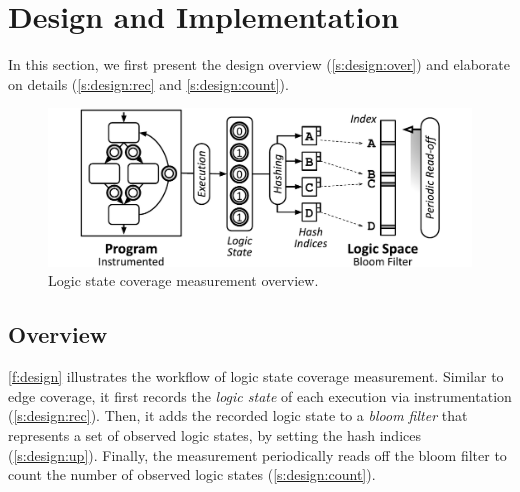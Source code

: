 \documentclass[letterpaper,twocolumn,10pt]{article}
\begin{document}


\section{Design and Implementation}
\label{s:design}

In this section, we first present the design overview (\autoref{s:design:over})
and elaborate on details (\autoref{s:design:rec} and \ref{s:design:count}).


\begin{figure}[t]
  \centering
  \includegraphics[width=\columnwidth]{images/design.pdf}
  \caption{Logic state coverage measurement overview.}
  \label{f:design}
\end{figure}


\subsection{Overview}
\label{s:design:over}


\autoref{f:design} illustrates the workflow of logic state coverage
measurement. Similar to edge coverage, it first records the \emph{logic state}
of each execution via instrumentation (\autoref{s:design:rec}). Then, it adds
the recorded logic state to a \emph{bloom filter} that represents a set of
observed logic states, by setting the hash indices (\autoref{s:design:up}).
Finally, the measurement periodically reads off the bloom filter to count the
number of observed logic states (\autoref{s:design:count}).
\end{document}
